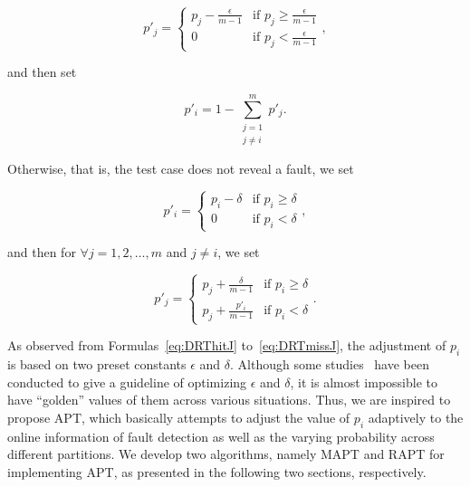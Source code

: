 \documentclass[10pt,journal,compsoc]{IEEEtran}
\begin{document}
\begin{equation}
\label{eq:DRThitJ}
p'_j =
\begin{cases}
p_j - \displaystyle\frac{\epsilon}{m-1} & \text{if } p_j \geq \displaystyle\frac{\epsilon}{m-1} \\
0 & \text{if } p_j < \displaystyle\frac{\epsilon}{m-1}
\end{cases},
\end{equation}

and then set

\begin{equation}
\label{eq:DRThitI}
p'_i = 1 - \sum_{\substack{j = 1 \\ j \neq i}}^m p'_j.
\end{equation}

Otherwise, that is, the test case does not reveal a fault, we set

\begin{equation}
\label{eq:DRTmissI}
p'_i =
\begin{cases}
p_i - \delta & \text{if } p_i \geq \delta \\
0 & \text{if } p_i < \delta
\end{cases},
\end{equation}

and then for $\forall j = 1, 2, \ldots, m$ and $j \neq i$, we set

\begin{equation}
\label{eq:DRTmissJ}
p'_j =
\begin{cases}
p_j + \displaystyle\frac{\delta}{m-1} & \text{if } p_i \geq \delta \\
p_j + \displaystyle\frac{p'_i}{m-1} & \text{if } p_i < \delta
\end{cases}.
\end{equation}

As observed from Formulas~\ref{eq:DRThitJ} to~\ref{eq:DRTmissJ}, the adjustment of $p_i$ is based on two preset constants $\epsilon$ and $\delta$. Although some studies~\cite{Lv11, Yang14, Li15} have been conducted to give a guideline of optimizing $\epsilon$ and $\delta$, it is almost impossible to have ``golden'' values of them across various situations. Thus, we are inspired to propose APT, which basically attempts to adjust the value of $p_i$ adaptively to the online information of fault detection as well as the varying probability across different partitions. We develop two algorithms, namely MAPT and RAPT for implementing APT, as presented in the following two sections, respectively.
\end{document}

